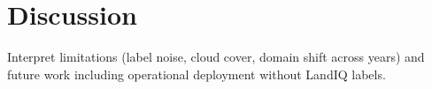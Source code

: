 \section{Discussion}

Interpret limitations (label noise, cloud cover, domain shift across years) and future work including operational deployment without LandIQ labels.
